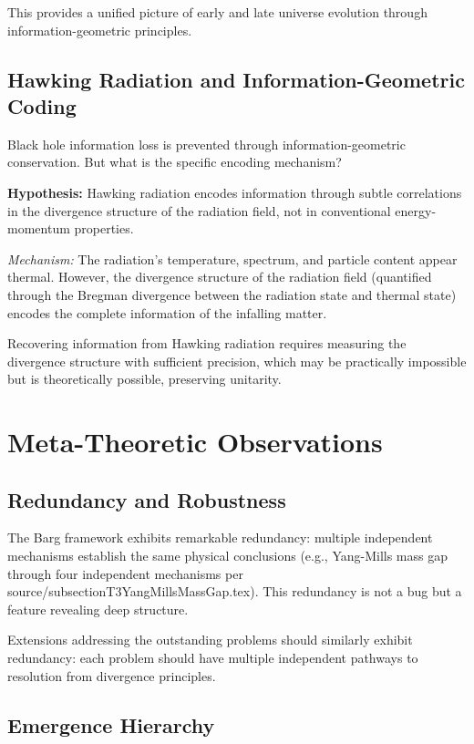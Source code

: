 \documentclass[12pt,a4paper]{article}
\begin{document}
This provides a unified picture of early and late universe evolution through information-geometric principles.

\subsection{Hawking Radiation and Information-Geometric Coding}

Black hole information loss is prevented through information-geometric conservation. But what is the specific encoding mechanism?

\textbf{Hypothesis:} Hawking radiation encodes information through subtle correlations in the divergence structure of the radiation field, not in conventional energy-momentum properties.

\textit{Mechanism:} The radiation's temperature, spectrum, and particle content appear thermal. However, the divergence structure of the radiation field (quantified through the Bregman divergence between the radiation state and thermal state) encodes the complete information of the infalling matter.

Recovering information from Hawking radiation requires measuring the divergence structure with sufficient precision, which may be practically impossible but is theoretically possible, preserving unitarity.

\section{Meta-Theoretic Observations}

\subsection{Redundancy and Robustness}

The Barg framework exhibits remarkable redundancy: multiple independent mechanisms establish the same physical conclusions (e.g., Yang-Mills mass gap through four independent mechanisms per source/subsectionT3YangMillsMassGap.tex). This redundancy is not a bug but a feature revealing deep structure.

Extensions addressing the outstanding problems should similarly exhibit redundancy: each problem should have multiple independent pathways to resolution from divergence principles.

\subsection{Emergence Hierarchy}
\end{document}
